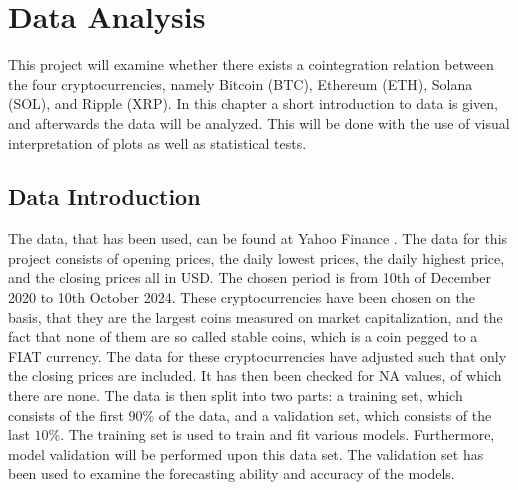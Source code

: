 \chapter{Data Analysis}\label{chap:dataanlysis}
This project will examine whether there exists a cointegration relation between the four cryptocurrencies, namely Bitcoin (BTC), Ethereum (ETH), Solana (SOL), and Ripple (XRP). In this chapter a short introduction to data is given, and afterwards the data will be analyzed. This will be done with the use of visual interpretation of plots as well as statistical tests.

\section{Data Introduction}
The data, that has been used, can be found at Yahoo Finance \cite{Yahoo_Finance}. The data for this project consists of opening prices, the daily lowest prices, the daily highest price, and the closing prices all in USD. The chosen period is from 10th of December 2020 to 10th October 2024. These cryptocurrencies have been chosen on the basis, that they are the largest coins measured on market capitalization, and the fact that none of them are so called stable coins, which is a coin pegged to a FIAT currency. The data for these cryptocurrencies have adjusted such that only the closing prices are included. It has then been checked for NA values, of which there are none. The data is then split into two parts: a training set, which consists of the first $90\%$ of the data, and a validation set, which consists of the last $10\%$. The training set is used to train and fit various models. Furthermore, model validation will be performed upon this data set. The validation set has been used to examine the forecasting ability and accuracy of the models.\\
